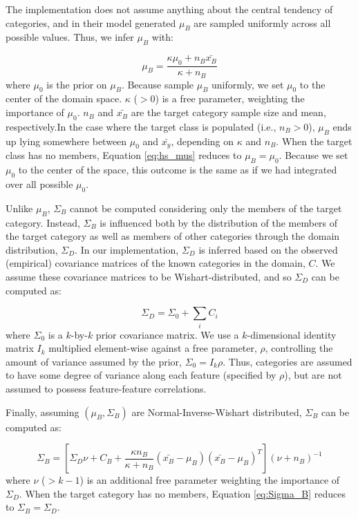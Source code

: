 \documentclass[10pt,letterpaper]{article}
\begin{document}
The \citet{jern2013probabilistic} implementation does not assume anything about the central tendency of categories, and in their model generated $\mu_B$ are sampled uniformly across all possible values. Thus, we infer $\mu_B$ with:

\begin{equation}
  \mu_B = \dfrac
    {\kappa\mu_{0} + n_B \bar{x_B}}
    {\kappa + n_B}
    \label{eq:hs_mus}
\end{equation}
% 
where $\mu_0$ is the prior on $\mu_B$. Because \citet{jern2013probabilistic} sample $\mu_B$ uniformly, we set $\mu_0$ to the center of the domain space. $\kappa$ ($>0$) is a free parameter, weighting the importance of $\mu_0$. $n_B$ and $\bar{x_B}$ are the target category sample size and mean, respectively.In the case where the target class is populated (i.e., $n_B > 0$), $\mu_{B}$ ends up lying somewhere between $\mu_{0}$ and $\bar{x_y}$, depending on $\kappa$ and $n_B$. When the target class has no members, Equation \ref{eq:hs_mus} reduces to $\mu_{B} = \mu_{0}$. Because we set $\mu_0$ to the center of the space, this outcome is the same as if we had integrated over all possible $\mu_0$.

Unlike $\mu_B$, $\Sigma_B$ cannot be computed considering only the members of the target category. Instead, $\Sigma_B$ is influenced both by the distribution of the members of the target category as well as members of other categories through the domain distribution, $\Sigma_D$. In our implementation, $\Sigma_D$ is inferred based on the observed (empirical)  covariance matrices of the known categories in the domain, $C$. We assume these covariance matrices to be Wishart-distributed, and so $\Sigma_D$ can be computed as:

\begin{equation}
    \Sigma_D = \Sigma_0 + \sum_{i}{C_i}
\end{equation}
%
where $\Sigma_{0}$ is a $k$-by-$k$ prior covariance matrix. We use a $k$-dimensional identity matrix $I_k$ multiplied element-wise against a free parameter, $\rho$, controlling the amount of variance assumed by the prior, $\Sigma_0 =  I_k\rho$. Thus, categories are assumed to have some degree of variance along each feature (specified by $\rho$), but are not assumed to possess feature-feature correlations.

Finally, assuming $(\mu_B, \Sigma_B)$ are Normal-Inverse-Wishart distributed, $\Sigma_B$ can be computed as:

\begin{equation}
  \Sigma_B = [\Sigma_D \nu + C_B +
    \dfrac
    {\kappa n_B}
    {\kappa + n_B}
    (\bar{x_B}-\mu_B)(\bar{x_B}-\mu_B)^T
  ] (\nu + n_B)^{-1}
  \label{eq:Sigma_B}
\end{equation}
%
where $\nu$ ($>k-1$) is an additional free parameter weighting the importance of $\Sigma_{D}$. When the target category has no members, Equation \ref{eq:Sigma_B} reduces to $\Sigma_B = \Sigma_D$. 
\end{document}
